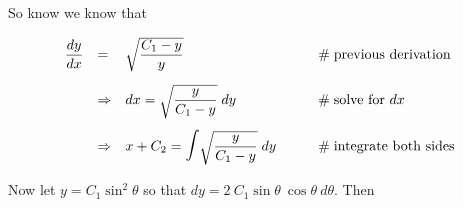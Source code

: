 \documentclass{article}
\theoremstyle{definition}
\begin{document}
\bigskip
\noindent
So know we know that 



\begin{equation*}
\begin{array}{lllll}
\dfrac{dy}{dx}
&=& \sqrt{\dfrac{C_1 - y}{y}}																		&\qquad \mathrel{\#} \text{previous derivation} \\
[15pt]
&\Rightarrow& dx = \sqrt{\dfrac{y}{C_1 -y}} \; dy													&\qquad \mathrel{\#} \text{solve for $dx$} \\
[15pt]
&\Rightarrow& x + C_2  = \mathlarger{\mathlarger{\mathlarger{\int}}} \sqrt{\dfrac{y}{C_1 -y}} \; dy	&\qquad \mathrel{\#} \text{integrate both sides}
\end{array}
\end{equation*}

\smallskip
\bigskip
\noindent
Now let $y = C_1 \sin^2 \theta$ so that
$dy = 2 \: C_1 \sin \theta \: \cos \theta \: d\theta$. 
Then
\end{document}
